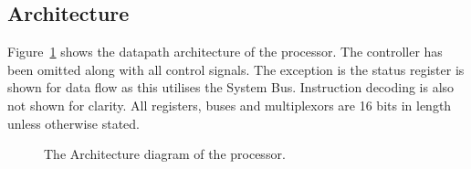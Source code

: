 \subsection{Architecture}

Figure~\ref{fig:architecture} shows the datapath architecture of the \samurai{} processor. 
The controller has been omitted along with all control signals. 
The exception is the status register is shown for data flow as this utilises the System Bus. 
Instruction decoding is also not shown for clarity. 
All registers, buses and multiplexors are 16 bits in length unless otherwise stated. 

\begin{figure}
\vspace*{-1.5in}
\caption{The Architecture diagram of the \samurai{} processor.}
\label{fig:architecture}
\end{figure}
